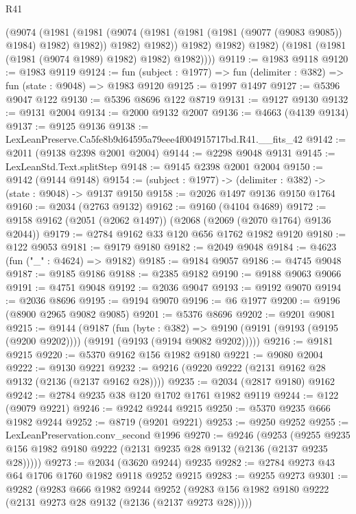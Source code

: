 \begin{lexlean}{R41}
\begin{coremodule}
                (@9074
                  (@1981
                    (@1981
                      (@9074 (@1981 (@1981 (@1981 (@9077 (@9083 @9085)) @1984) @1982) @1982))
                      @1982)
                    @1982))
                @1982)
              @1982)
            @1982)
          (@1981 (@1981 (@1981 (@9074 @1989) @1982) @1982) @1982))))
@9119 := @1983 @9118
@9120 := @1983 @9119
@9124 := fun (subject : @1977) => fun (delimiter : @382) => fun (state : @9048) => @1983 @9120
@9125 := @1997 @1497
@9127 := @5396 @9047 @122
@9130 := @5396 @8696 @122 @8719
@9131 := @9127 @9130
@9132 := @9131 @2004
@9134 := @2000 @9132 @2007
@9136 := @4663 (@4139 @9134)
@9137 := @9125 @9136
@9138 := LexLeanPreserve.Ca5fe8b9d64595a79eee4f004915717bd.R41.__fits_42
@9142 := @2011 (@9138 @2398 @2001 @2004)
@9144 := @2298 @9048 @9131
@9145 := LexLeanStd.Text.splitStep
@9148 := @9145 @2398 @2001 @2004
@9150 := @9142 (@9144 @9148)
@9154 := (subject : @1977) -> (delimiter : @382) -> (state : @9048) -> @9137 @9150
@9158 := @2026 @1497 @9136 @9150 @1764
@9160 := @2034 (@2763 @9132)
@9162 := @9160 (@4104 @4689)
@9172 := @9158 @9162 (@2051 (@2062 @1497)) (@2068 (@2069 (@2070 @1764) @9136 @2044))
@9179 := @2784 @9162 @33 @120 @656 @1762 @1982 @9120
@9180 := @122 @9053
@9181 := @9179 @9180
@9182 := @2049 @9048
@9184 := @4623 (fun ("_" : @4624) => @9182)
@9185 := @9184 @9057
@9186 := @4745 @9048
@9187 := @9185 @9186
@9188 := @2385 @9182
@9190 := @9188 @9063 @9066
@9191 := @4751 @9048
@9192 := @2036 @9047
@9193 := @9192 @9070
@9194 := @2036 @8696
@9195 := @9194 @9070
@9196 := @6 @1977
@9200 := @9196 (@8900 @2965 @9082 @9085)
@9201 := @5376 @8696
@9202 := @9201 @9081
@9215 := @9144
    (@9187
      (fun (byte : @382) =>
      @9190 (@9191 (@9193 (@9195 (@9200 @9202)))) (@9191 (@9193 (@9194 @9082 @9202)))))
@9216 := @9181 @9215
@9220 := @5370 @9162 @156 @1982 @9180
@9221 := @9080 @2004
@9222 := @9130 @9221
@9232 := @9216 (@9220 @9222 (@2131 @9162 @28 @9132 (@2136 (@2137 @9162 @28))))
@9235 := @2034 (@2817 @9180) @9162
@9242 := @2784 @9235 @38 @120 @1702 @1761 @1982 @9119
@9244 := @122 (@9079 @9221)
@9246 := @9242 @9244 @9215
@9250 := @5370 @9235 @666 @1982 @9244
@9252 := @8719 (@9201 @9221)
@9253 := @9250 @9252
@9255 := LexLeanPreservation.conv_second @1996
@9270 := @9246
    (@9253 (@9255 @9235 @156 @1982 @9180 @9222 (@2131 @9235 @28 @9132 (@2136 (@2137 @9235 @28)))))
@9273 := @2034 (@3620 @9244) @9235
@9282 := @2784 @9273 @43 @64 @1706 @1760 @1982 @9118 @9252 @9215
@9283 := @9255 @9273
@9301 := @9282
    (@9283
      @666
      @1982
      @9244
      @9252
      (@9283 @156 @1982 @9180 @9222 (@2131 @9273 @28 @9132 (@2136 (@2137 @9273 @28)))))

\end{coremodule}
\end{lexlean}
